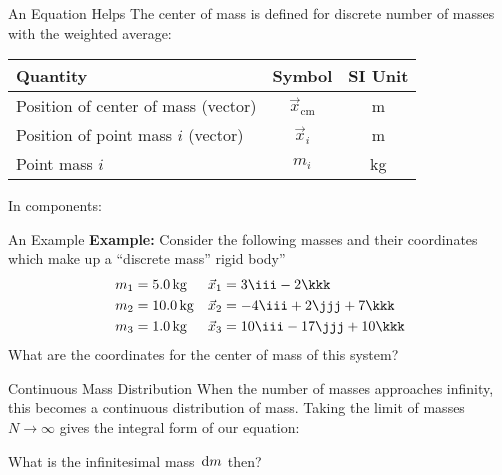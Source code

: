 \documentclass[12pt,compress,aspectratio=169]{beamer}
\begin{document}
\begin{frame}{An Equation Helps}
  The center of mass is defined for discrete number of masses with the weighted
  average:

  \begin{center}
    \begin{tabular}{l|c|c}
      \rowcolor{pink}
      \textbf{Quantity} & \textbf{Symbol} & \textbf{SI Unit} \\ \hline
      Position of center of mass (vector) & $\vec x_\text{cm}$ & \si\metre \\
      Position of point mass $i$ (vector) & $\vec x_i$ & \si\metre \\
      Point mass $i$ & $m_i$ & \si{\kilo\gram}
    \end{tabular}
  \end{center}
  In components:

\end{frame}



\begin{frame}{An Example}
  \textbf{Example:} Consider the following masses and their coordinates
  which make up a ``discrete mass'' rigid body''
  \begin{align*}
    m_1&=\SI{5.0}{\kg} &\vec x_1&=3\iii-2\kkk\\
    m_2&=\SI{10.0}{\kg}&\vec x_2&=-4\iii+2\jjj+7\kkk\\
    m_3&=\SI{1.0}{\kg}&\vec x_3&=10\iii-17\jjj+10\kkk
  \end{align*}
  What are the coordinates for the center of mass of this system?
\end{frame}



\begin{frame}{Continuous Mass Distribution}
  When the number of masses approaches infinity, this becomes a continuous
  distribution of mass. Taking the limit of masses $N\rightarrow\infty$ gives
  the integral form of our equation:


  What is the infinitesimal mass $\dl m$ then?
\end{frame}
\end{document}
